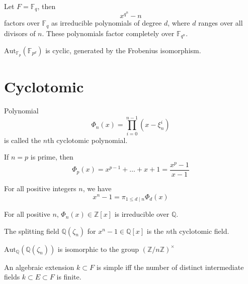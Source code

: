 \documentclass[openany]{book}
\newcommand{\Z}{\mathbb{Z}}
\newcommand{\F}{\mathbb{F}}
\newcommand{\Q}{\mathbb{Q}}
\begin{document}
\begin{cor}
    Let $F=\F_q$, then 
    \begin{equation*}
        x^{q^n}-n
    \end{equation*}
    factors over $\F_q$ as irreducible polynomials of degree $d$, where $d$ ranges over all divisors of $n$. These polynomials factor completely over $\F_{q^n}$.
\end{cor}

\begin{thm}
    $\text{Aut}_{\F_p}(\F_{p^d})$ is cyclic, generated by the Frobenius isomorphism.
\end{thm}

\section{Cyclotomic}
\begin{defn}
    Polynomial 
    \begin{equation*}
        \Phi_n(x)=\prod_{i=0}^{n-1}(x-\xi_n^i)
    \end{equation*}
    is called the $n$th cyclotomic polynomial.
\end{defn}

\begin{prop}
    If $n=p$ is prime, then 
    \begin{equation*}
        \Phi_p(x)=x^{p-1}+\dots+x+1=\frac{x^p-1}{x-1}
    \end{equation*}

    For all positive integers $n$, we have 
    \begin{equation*}
        x^n-1=\pi_{1\leq d\mid n}\Phi_d(x)
    \end{equation*}
\end{prop}


\begin{prop}
    For all positive $n$, $\Phi_n(x)\in\Z[x]$ is irreducible over $\Q$.
\end{prop}

\begin{defn}
    The splitting field $\Q(\zeta_n)$  for $x^n-1\in\Q[x]$  is the $n$th cyclotomic field. 
\end{defn}

\begin{prop}
    $\text{Aut}_\Q(\Q(\zeta_n))$ is isomorphic to the group $(\Z/n\Z)^\times$
\end{prop}



\begin{prop}
    An algebraic extension $k\subset F$ is simple iff the number of distinct intermediate fields $k\subset E\subset F$ is finite.
\end{prop}
\end{document}
